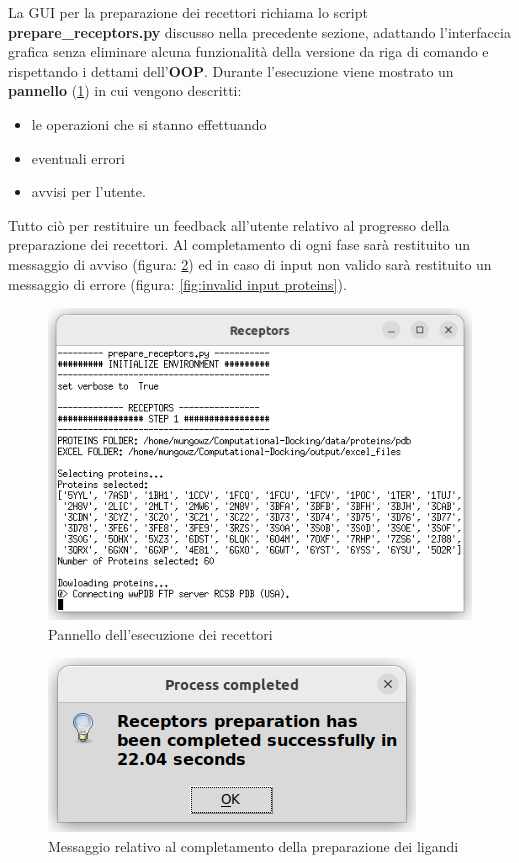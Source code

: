 La GUI per la preparazione dei recettori richiama lo script \textbf{prepare\_receptors.py} discusso nella precedente sezione, adattando l'interfaccia grafica senza eliminare alcuna funzionalità della versione da riga di comando e rispettando i dettami dell'\textbf{OOP}.\newline
Durante l'esecuzione viene mostrato un \textbf{pannello} (\ref{fig:receptors execution}) in cui vengono descritti:

\begin{itemize}
    \item le operazioni che si stanno effettuando
    \item eventuali errori
    \item avvisi per l'utente.  
\end{itemize}

Tutto ciò per restituire un feedback all'utente relativo al progresso della preparazione dei recettori. Al completamento di ogni fase sarà restituito un messaggio di avviso (figura: \ref{fig:progress completed proteins}) ed in caso di input non valido sarà restituito un messaggio di errore (figura: \ref{fig:invalid input proteins}).

\begin{figure}[H]
    \centering
    \includegraphics[scale=0.8]{immagini/capitolo3/receptorsExecution.png}
    \caption{Pannello dell'esecuzione dei recettori}
    \label{fig:receptors execution}
\end{figure}

\begin{figure}[H]
    \centering
    \includegraphics{immagini/capitolo3/progressCompletedReceptors.png}
    \caption{Messaggio relativo al completamento della preparazione dei ligandi}
    \label{fig:progress completed proteins}
\end{figure}

